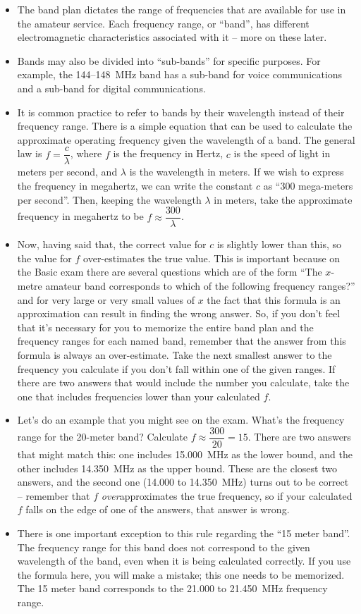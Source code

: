 \documentclass[letterpaper,12pt]{scrartcl}
\begin{document}
\begin{itemize}
\item The band plan dictates the range of frequencies that are available for use in the amateur service. Each frequency range, or ``band'', has different electromagnetic characteristics associated with it -- more on these later.
\item Bands may also be divided into ``sub-bands'' for specific purposes. For example, the 144--148~MHz band has a sub-band for voice communications and a sub-band for digital communications.
\item It is common practice to refer to bands by their wavelength instead of their frequency range. There is a simple equation that can be used to calculate the approximate operating frequency
given the wavelength of a band. The general law is $f = \dfrac{c}{\lambda}$, where $f$ is the frequency in Hertz, $c$ is the speed of light in meters per second, and $\lambda$ is the wavelength in meters.
If we wish to express the frequency in megahertz, we can write the constant $c$ as ``300 mega-meters per second''. Then, keeping the wavelength $\lambda$ in meters, take the approximate frequency in megahertz to be
$f \approx \dfrac{300}{\lambda}$. 
\item Now, having said that, the correct value for $c$ is slightly lower than this, so the value for $f$ over-estimates the true value. This is important because on the Basic exam
there are several questions which are of the form ``The $x$-metre amateur band corresponds to which of the following frequency ranges?'' and for very large or very small values of $x$ the fact that this formula
is an approximation can result in finding the wrong answer. So, if you don't feel that it's necessary for you to memorize the entire band plan and the frequency ranges for each named band,
remember that the answer from this formula is always an over-estimate. Take the next smallest answer to the frequency you calculate if you don't fall within one of the given ranges. If there are two answers
that would include the number you calculate, take the one that includes frequencies lower than your calculated $f$.
\item Let's do an example that you might see on the exam. What's the frequency range for the 20-meter band? Calculate $f \approx \dfrac{300}{20} = 15$. There are two answers that might match this:
one includes 15.000~MHz as the lower bound, and the other includes 14.350~MHz as the upper bound. These are the closest two answers, and the second one (14.000 to 14.350~MHz) turns out to be correct -- remember that $f$ \textit{over}approximates
the true frequency, so if your calculated $f$ falls on the edge of one of the answers, that answer is wrong.
\item There is one important exception to this rule regarding the ``15 meter band''. The frequency range for this band does not correspond to the given wavelength of the band, even when it is being
calculated correctly. If you use the formula here, you will make a mistake; this one needs to be memorized. The 15 meter band corresponds to the 21.000 to 21.450~MHz frequency range.
\end{itemize}
\end{document}
